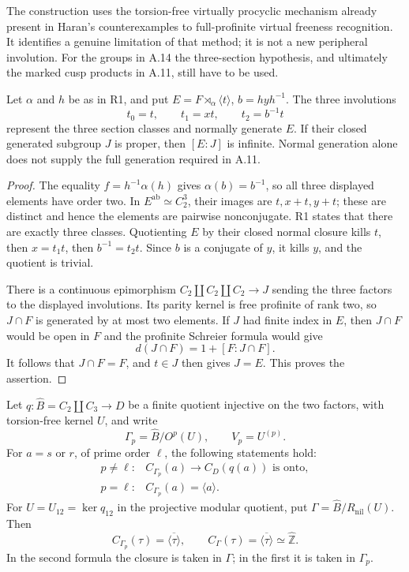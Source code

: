 The construction uses the torsion-free virtually
procyclic mechanism already present in Haran's
counterexamples to full-profinite virtual freeness
recognition.\cite{A_Haran1985}
It identifies a genuine limitation of that method;
it is not a new peripheral involution. For the groups
in A.14 the three-section hypothesis, and ultimately
the marked cusp products in A.11, still have to be used.

Let \(\alpha\) and \(h\) be as in R1, and put
\(E=F\rtimes_\alpha\langle t\rangle\), \(b=hyh^{-1}\).
The three involutions
\[
       t_0=t,\qquad t_1=xt,\qquad t_2=b^{-1}t
\]
represent the three section classes and normally
generate \(E\). If their closed generated subgroup
\(J\) is proper, then \([E:J]\) is infinite.
Normal generation alone does not supply the full
generation required in A.11.

\begin{proof}
The equality \(f=h^{-1}\alpha(h)\) gives
\(\alpha(b)=b^{-1}\), so all three displayed
elements have order two. In
\(E^{\mathrm{ab}}\simeq C_2^3\), their images are
\(t,x+t,y+t\); these are distinct and hence the
elements are pairwise nonconjugate. R1 states that
there are exactly three classes. Quotienting \(E\)
by their closed normal closure kills \(t\), then
\(x=t_1t\), then \(b^{-1}=t_2t\). Since \(b\) is a
conjugate of \(y\), it kills \(y\), and the quotient
is trivial.

There is a continuous epimorphism
\(C_2\amalg C_2\amalg C_2\to J\) sending the three
factors to the displayed involutions. Its parity
kernel is free profinite of rank two, so \(J\cap F\)
is generated by at most two elements. If \(J\)
had finite index in \(E\), then \(J\cap F\) would
be open in \(F\) and the profinite Schreier formula
would give
\[
 d(J\cap F)=1+[F:J\cap F].
\]
It follows that \(J\cap F=F\), and \(t\in J\)
then gives \(J=E\). This proves the assertion.
\end{proof}

Let \(q:\widehat B=C_2\amalg C_3\to D\) be a finite
quotient injective on the two factors, with torsion-free
kernel \(U\), and write
\[
 \Gamma_p=\widehat B/O^p(U),\qquad V_p=U^{(p)}.
\]
For \(a=s\) or \(r\), of prime order \(\ell\), the
following statements hold:
\[
 \begin{array}{ll}
 p\ne\ell:&C_{\Gamma_p}(a)\longrightarrow C_D(q(a))
                    \text{ is onto},\\[2pt]
 p=\ell:&C_{\Gamma_p}(a)=\langle a\rangle.
 \end{array}
\]
For \(U=U_{12}=\ker q_{12}\) in the projective modular
quotient, put \(\Gamma=\widehat B/R_{\mathrm{nil}}(U)\).
Then
\[
 C_{\Gamma_p}(\tau)=\overline{\langle\tau\rangle},
 \qquad C_\Gamma(\tau)=\overline{\langle\tau\rangle}
                    \simeq\widehat{\mathbb Z}.
\]
In the second formula the closure is taken in \(\Gamma\);
in the first it is taken in \(\Gamma_p\).

